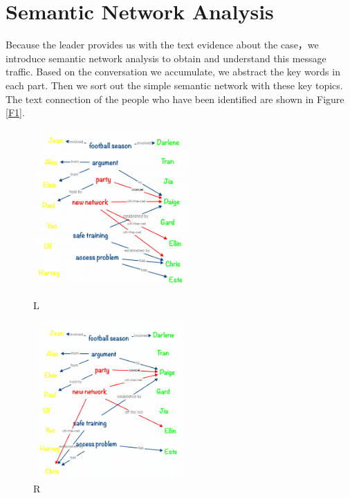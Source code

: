 \documentclass[12pt]{article}
\begin{document}
\section{Semantic Network Analysis}
	Because the leader provides us with the text evidence about the case，we introduce semantic network analysis to obtain and understand this message traffic. Based on the conversation we accumulate, we abstract the key words in each part. Then we sort out the simple semantic network with these key topics. The text connection of the people who have been identified are shown in Figure \ref{F1}.

\begin{figure}
\begin{center}
\begin{minipage}[c]{0.5\textwidth}
\centering\includegraphics[width=6cm,height=6cm]{netwrok1.png}%
\renewcommand{\figurename}{\textbf{Fig}}
\caption{L}
\label{F1}
\end{minipage}%
\begin{minipage}[c]{0.5\textwidth}
\centering\includegraphics[width=6cm,height=6cm]{network2.png}%
\renewcommand{\figurename}{\textbf{Fig}}
\caption{R}
\label{F3}
\end{minipage}
\end{center}
\end{figure}
%
\end{document}
